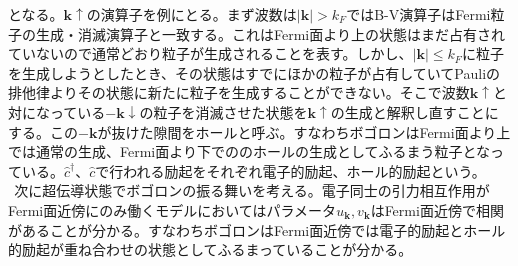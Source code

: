 \documentclass[dvipdfmx, 11pt, a4paper]{jsarticle}
\numberwithin{equation}{section}
\theoremstyle{definition}
\begin{document}
    となる。$\bm{k}\uparrow$の演算子を例にとる。まず波数は$|\bm{k}|>k_F$ではB-V演算子はFermi粒子の生成・消滅演算子と一致する。これはFermi面より上の状態はまだ占有されていないので通常どおり粒子が生成されることを表す。しかし、$|\bm{k}|\le k_F$に粒子を生成しようとしたとき、その状態はすでにほかの粒子が占有していてPauliの排他律よりその状態に新たに粒子を生成することができない。そこで波数$\bm{k}\uparrow$と対になっている$-\bm{k}\downarrow$の粒子を消滅させた状態を$\bm{k}\uparrow$の生成と解釈し直すことにする。この$-\bm{k}$が抜けた隙間をホールと呼ぶ。すなわちボゴロンはFermi面より上では通常の生成、Fermi面より下でののホールの生成としてふるまう粒子となっている。$\hat{c}^\dagger$、$\hat{c}$で行われる励起をそれぞれ電子的励起、ホール的励起という。\\
    $\ \ $次に超伝導状態でボゴロンの振る舞いを考える。電子同士の引力相互作用がFermi面近傍にのみ働くモデルにおいてはパラメータ$u_{\bm{k}},v_{\bm{k}}$はFermi面近傍で相関があることが分かる。すなわちボゴロンはFermi面近傍では電子的励起とホール的励起が重ね合わせの状態としてふるまっていることが分かる。
\end{document}
